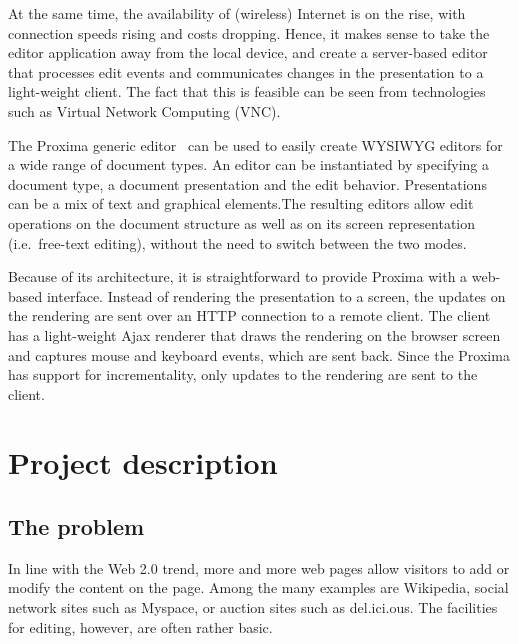 \documentclass[10pt]{article}
\begin{document}
At the same time, the availability of (wireless) Internet is on the rise, with connection speeds rising and costs dropping. Hence, it makes sense to take the editor application away from the local device, and create a server-based editor that processes edit events and communicates changes in the presentation to a light-weight client. The fact that this is feasible can be seen from technologies such as Virtual Network Computing (VNC).

The Proxima generic editor~\cite{schrage08proximaHome, schrage04proxima} can be used to easily create WYSIWYG editors for a wide range of document types. An editor can be instantiated by specifying a document type, a document presentation and the edit behavior. Presentations can be a mix of text and graphical elements.The resulting editors allow edit operations on the document structure as well as on its screen representation (i.e.\ free-text editing), without the need to switch between the two modes.

Because of its architecture, it is straightforward to provide Proxima with a web-based interface. Instead of rendering the presentation to a screen, the updates on the rendering are sent over an HTTP connection to a remote client. The client has a light-weight Ajax renderer that draws the rendering on the browser screen and captures mouse and keyboard events, which are sent back. Since the Proxima has support for incrementality, only updates to the rendering are sent to the client.

\ec




\section{Project description}

\subsection{The problem} 

In line with the Web 2.0 trend, more and more web pages allow visitors to add or modify the content on the page. Among the many examples are Wikipedia, social network sites such as Myspace, or auction sites such as del.ici.ous. The facilities for editing, however, are often rather basic. 
\end{document}
